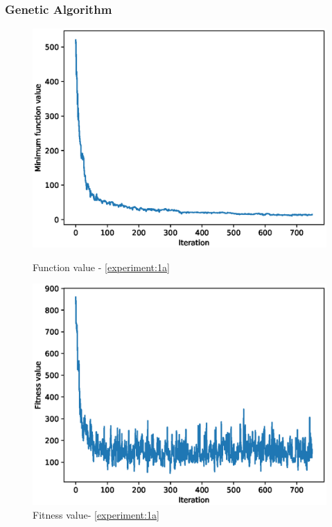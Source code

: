 \documentclass{article}
\begin{document}
\subsubsection{Genetic Algorithm}
\begin{figure}[!htbp]
	\centering
	\begin{minipage}{.48\textwidth}
		\centering
		\includegraphics[scale=.4]{experiment_1a_griewangk/min_eval_0.eps}
		\caption{Function value - \ref{experiment:1a}}
	\end{minipage}\hfill
	\begin{minipage}{.48\textwidth}
		\centering
		\includegraphics[scale=.4]{experiment_1a_griewangk/max_fitness_0.eps}
		\caption{Fitness value- \ref{experiment:1a}}
	\end{minipage}
\end{figure}
\end{document}
